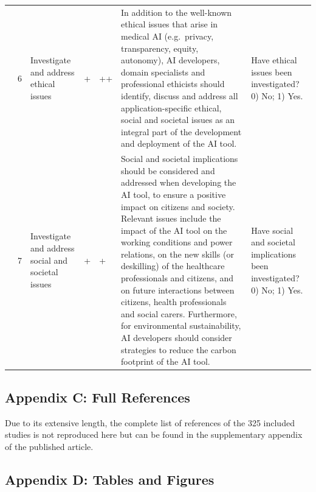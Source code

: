 \begin{landscape}
\begin{longtable}{@{}p{0.9cm}p{0.5cm}p{2.8cm}p{0.6cm}p{0.6cm}p{7.2cm}p{5.5cm}@{}}
	\addlinespace
	& 6 & Investigate and address ethical issues & + & ++ & In addition to the well-known ethical issues that arise in medical AI (e.g.\ privacy, transparency, equity, autonomy), AI developers, domain specialists and professional ethicists should identify, discuss and address all application-specific ethical, social and societal issues as an integral part of the development and deployment of the AI tool. & Have ethical issues been investigated? 0) No; 1) Yes. \\
	\addlinespace
	& 7 & Investigate and address social and societal issues & + & + & Social and societal implications should be considered and addressed when developing the AI tool, to ensure a positive impact on citizens and society. Relevant issues include the impact of the AI tool on the working conditions and power relations, on the new skills (or deskilling) of the healthcare professionals and citizens, and on future interactions between citizens, health professionals and social carers. Furthermore, for environmental sustainability, AI developers should consider strategies to reduce the carbon footprint of the AI tool. & Have social and societal implications been investigated? 0) No; 1) Yes. \\
\end{longtable}
\end{landscape}

\subsection{Appendix C: Full References}
\label{sec:ch1_appC}
Due to its extensive length, the complete list of references of the 325 included studies is not reproduced here but can be found in the supplementary appendix of the published article.

\subsection{Appendix D: Tables and Figures}
\label{sec:ch1_appD}


